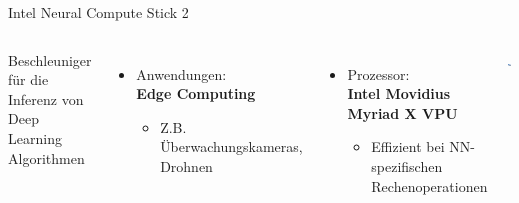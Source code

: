 \begin{frame}{Intel Neural Compute Stick 2}
    \begin{columns}[T]
        Beschleuniger für die Inferenz von Deep Learning Algorithmen
        \vspace{0.3cm}

        \begin{itemize}
            \item Anwendungen:\\\textbf{Edge Computing}
            \begin{itemize}
                \item Z.B. Überwachungskameras, Drohnen
            \end{itemize}
        \end{itemize}

        \begin{itemize}    
            \item Prozessor:\\\textbf{Intel Movidius Myriad X VPU}
            \begin{itemize}
                \item Effizient bei NN-spezifischen Rechenoperationen
            \end{itemize}    
        \end{itemize}
        
        \vspace{1cm}
        \includegraphics[width=0.8\textwidth]{Bilder/ncs2.jpg}
    \end{columns}        
\end{frame}